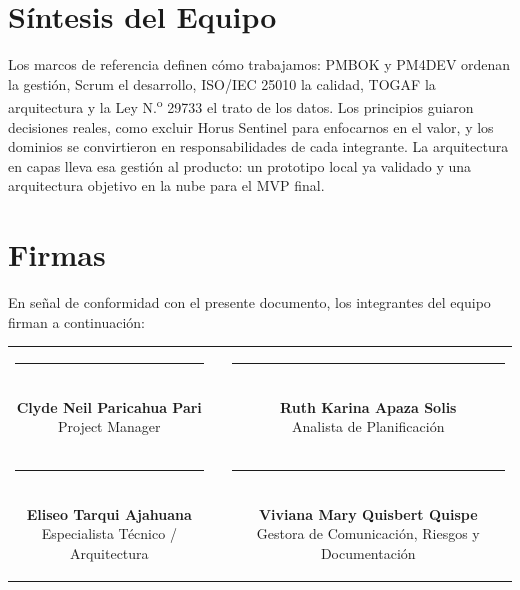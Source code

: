 \documentclass[11pt,a4paper]{article}
\begin{document}
\section{Síntesis del Equipo}
Los marcos de referencia definen cómo trabajamos: PMBOK y PM4DEV ordenan la gestión, Scrum el desarrollo, ISO/IEC 25010 la calidad, TOGAF la arquitectura y la Ley N.\textsuperscript{o} 29733 el trato de los datos. Los principios guiaron decisiones reales, como excluir Horus Sentinel para enfocarnos en el valor, y los dominios se convirtieron en responsabilidades de cada integrante. La arquitectura en capas lleva esa gestión al producto: un prototipo local ya validado y una arquitectura objetivo en la nube para el MVP final.

\section{Firmas}
\noindent En señal de conformidad con el presente documento, los integrantes del equipo firman a continuación:

\vspace{1.5cm}
\begin{center}
\begin{tabular}{c c c}
    \parbox{6.5cm}{\centering \rule{6.0cm}{0.6pt}\\[5pt] \textbf{Clyde Neil Paricahua Pari}\\[2pt] {\footnotesize Project Manager}}
    & \hspace{0.8cm} &
    \parbox{6.5cm}{\centering \rule{6.0cm}{0.6pt}\\[5pt] \textbf{Ruth Karina Apaza Solis}\\[2pt] {\footnotesize Analista de Planificación}}
    \\[2.0cm]
    \parbox{6.5cm}{\centering \rule{6.0cm}{0.6pt}\\[5pt] \textbf{Eliseo Tarqui Ajahuana}\\[2pt] {\footnotesize Especialista Técnico / Arquitectura}}
    & \hspace{0.8cm} &
    \parbox{6.5cm}{\centering \rule{6.0cm}{0.6pt}\\[5pt] \textbf{Viviana Mary Quisbert Quispe}\\[2pt] {\footnotesize Gestora de Comunicación, Riesgos y Documentación}}
\end{tabular}
\end{center}
\end{document}
